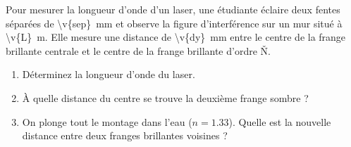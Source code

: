 Pour mesurer la longueur d'onde d'un laser, une étudiante éclaire deux fentes séparées de \qty{\v{sep}}{mm} et observe la figure d'interférence sur un mur situé à \qty{\v{L}}{m}. Elle mesure une distance de \qty{\v{dy}}{mm} entre le centre de la frange brillante centrale et le centre de la frange brillante d'ordre \v{N}.

\begin{enumerate}[label=\alph*)]
    \item Déterminez la longueur d'onde du laser.
    \item À quelle distance du centre se trouve la deuxième frange sombre ?
    \item On plonge tout le montage dans l'eau ($n = \num{1.33}$). Quelle est la nouvelle distance entre deux franges brillantes voisines ?
\end{enumerate}
